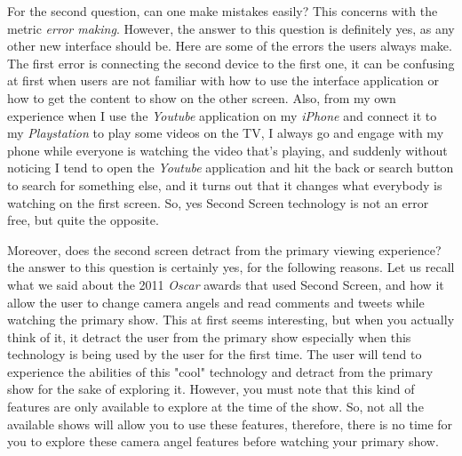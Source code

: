 \documentclass[12pt, oneside]{amsart}   	%
\begin{document}
 For the second question, can one make mistakes easily?  This concerns with the metric  \emph{error making}. However, the answer to this question is definitely yes, as any other new interface should be.
Here are some of the errors the users always make.  The first error is connecting the second device to the first one, it can be confusing at first when users are not familiar with how to use the interface application or how to get the content to show on the other screen.  Also, from my own experience when I use the \emph{Youtube} application on my  \emph{iPhone} and connect it to my  \emph{Playstation} to play  some videos on the TV, I always go and engage with my phone while everyone is watching the video that's playing,  and suddenly without noticing I tend to open the \emph{Youtube} application and hit the back or search button to search for something else, and it turns out that it changes what everybody is watching on the first screen.  So, yes Second Screen technology is not an error free, but quite the opposite.

 Moreover, does the second screen detract from the primary viewing experience?  the answer to this question is certainly yes, for the following reasons.  Let us recall what we said about the 2011 \emph{Oscar} awards that used Second Screen, and how it allow the user to change camera angels and read comments and tweets while watching the primary show.  This at first seems interesting, but when you actually think of it, it detract the user from the primary show especially when this technology is being used  by the user for the first time.  The user will tend to experience the abilities of this "cool" technology and detract from the primary show for the sake of exploring it.  However, you must note that this kind of features are only available to explore at the time of the show.  So, not all the available shows will allow you to use these features, therefore, there is no time for you to explore these camera angel features before watching your primary show. 
 
\end{document}
